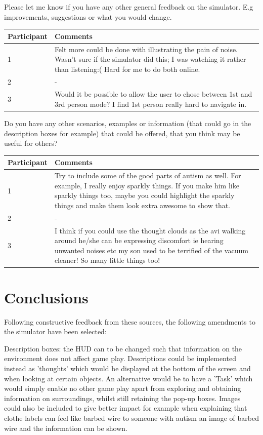 \documentclass[11pt]{report}
\begin{document}
Please let me know if you have any other general feedback on the simulator. E.g improvements, suggestions or what you would change.
\begin{table}[H]
    \begin{tabular}{| p{3cm} | p{12cm} |}
    \hline
     Participant & Comments \\ \hline
     1 & Felt more could be done with illustrating the pain of noise. Wasn't sure if the simulator did this; I was watching it rather than listening:( Hard for me to do both online. \\ \hline
     2 & - \\ \hline
     3 & Would it be possible to allow the user to chose between 1st and 3rd person mode? I find 1st person really hard to navigate in. \\ \hline
    \end{tabular}
\end{table}

Do you have any other scenarios, examples or information (that could go in the description boxes for example) that could be offered, that you think may be useful for others?

\begin{table}[H]
    \begin{tabular}{| p{3cm} | p{12cm} |}
    \hline
     Participant & Comments \\ \hline
     1 & Try to include some of the good parts of autism as well. For example, I really enjoy sparkly things. If you make him like sparkly things too, maybe you could highlight the sparkly things and make them look extra awesome to show that.  \\ \hline
     2 & - \\ \hline
     3 & I think if you could use the thought clouds as the avi walking around he/she can be expressing discomfort ie hearing unwanted noises etc my son used to be terrified of the vacuum cleaner! So many little things too! \\ \hline
    \end{tabular}
\end{table}


\section{Conclusions}

Following constructive feedback from these sources, the following amendments to the simulator have been selected:

Description boxes: the HUD can to be changed such that information on the environment does not affect game play. Descriptions could be implemented instead as 'thoughts' which would be displayed at the bottom of the screen and when looking at certain objects. An alternative would be to have a 'Task' which would simply enable no other game play apart from exploring and obtaining information on surroundings, whilst still retaining the pop-up boxes. Images could also be included to give better impact for example when explaining that clothe labels can feel like barbed wire to someone with autism an image of barbed wire and the information can be shown.
\end{document}
